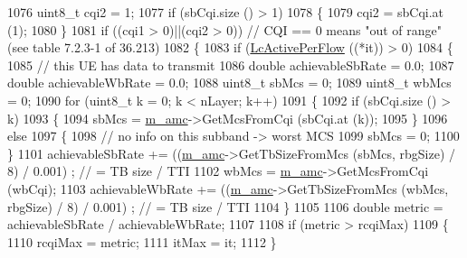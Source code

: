 \begin{DoxyCode}
1076               uint8\_t cqi2 = 1;
1077               \textcolor{keywordflow}{if} (sbCqi.size () > 1)
1078                 \{
1079                   cqi2 = sbCqi.at (1);
1080                 \}
1081               \textcolor{keywordflow}{if} ((cqi1 > 0)||(cqi2 > 0)) \textcolor{comment}{// CQI == 0 means "out of range" (see table 7.2.3-1 of 36.213)}
1082                 \{
1083                   \textcolor{keywordflow}{if} (\hyperlink{classns3_1_1TtaFfMacScheduler_a2907ecc4ef7185be679248f833fc931b}{LcActivePerFlow} ((*it)) > 0)
1084                     \{
1085                       \textcolor{comment}{// this UE has data to transmit}
1086                       \textcolor{keywordtype}{double} achievableSbRate = 0.0;
1087                       \textcolor{keywordtype}{double} achievableWbRate = 0.0;
1088                       uint8\_t sbMcs = 0;
1089                       uint8\_t wbMcs = 0; 
1090                       \textcolor{keywordflow}{for} (uint8\_t k = 0; k < nLayer; k++)
1091                         \{
1092                           \textcolor{keywordflow}{if} (sbCqi.size () > k)
1093                             \{
1094                               sbMcs = \hyperlink{classns3_1_1TtaFfMacScheduler_a9c8e60d48cae88a03fb5621285733186}{m\_amc}->GetMcsFromCqi (sbCqi.at (k));
1095                             \}
1096                           \textcolor{keywordflow}{else}
1097                             \{
1098                               \textcolor{comment}{// no info on this subband -> worst MCS}
1099                               sbMcs = 0;
1100                             \}
1101                           achievableSbRate += ((\hyperlink{classns3_1_1TtaFfMacScheduler_a9c8e60d48cae88a03fb5621285733186}{m\_amc}->GetTbSizeFromMcs (sbMcs, rbgSize) / 8) / 0.001)
      ;   \textcolor{comment}{// = TB size / TTI}
1102                           wbMcs = \hyperlink{classns3_1_1TtaFfMacScheduler_a9c8e60d48cae88a03fb5621285733186}{m\_amc}->GetMcsFromCqi (wbCqi);
1103                           achievableWbRate += ((\hyperlink{classns3_1_1TtaFfMacScheduler_a9c8e60d48cae88a03fb5621285733186}{m\_amc}->GetTbSizeFromMcs (wbMcs, rbgSize) / 8) / 0.001)
      ;   \textcolor{comment}{// = TB size / TTI}
1104                         \}
1105 
1106                       \textcolor{keywordtype}{double} metric = achievableSbRate / achievableWbRate;
1107 
1108                       \textcolor{keywordflow}{if} (metric > rcqiMax)
1109                         \{
1110                           rcqiMax = metric;
1111                           itMax = it;
1112                         \}

\end{DoxyCode}
